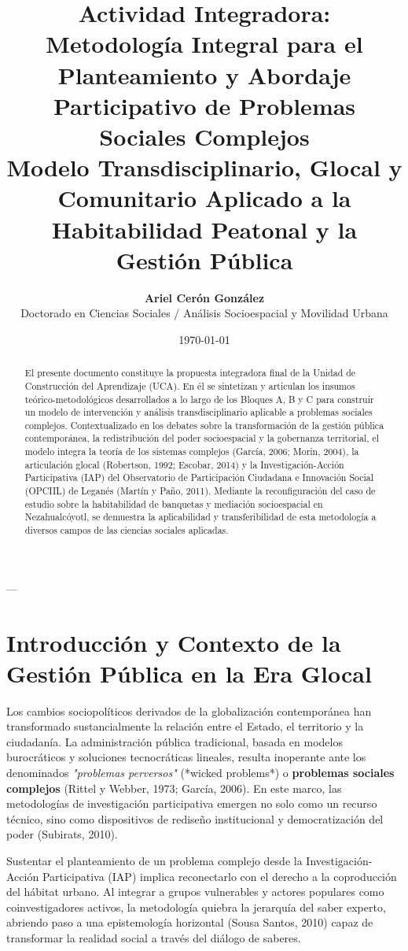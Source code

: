\documentclass[12pt,a4paper]{article}
\title{\textbf{Actividad Integradora: Metodología Integral para el Planteamiento y Abordaje Participativo de Problemas Sociales Complejos}\\
\large Modelo Transdisciplinario, Glocal y Comunitario Aplicado a la Habitabilidad Peatonal y la Gestión Pública}
\author{\textbf{Ariel Cerón González}\\ Doctorado en Ciencias Sociales / Análisis Socioespacial y Movilidad Urbana}
\date{\today}
\begin{document}
\maketitle

\begin{abstract}
El presente documento constituye la propuesta integradora final de la Unidad de Construcción del Aprendizaje (UCA). En él se sintetizan y articulan los insumos teórico-metodológicos desarrollados a lo largo de los Bloques A, B y C para construir un modelo de intervención y análisis transdisciplinario aplicable a problemas sociales complejos. Contextualizado en los debates sobre la transformación de la gestión pública contemporánea, la redistribución del poder socioespacial y la gobernanza territorial, el modelo integra la teoría de los sistemas complejos (García, 2006; Morin, 2004), la articulación glocal (Robertson, 1992; Escobar, 2014) y la Investigación-Acción Participativa (IAP) del Observatorio de Participación Ciudadana e Innovación Social (OPCIIL) de Leganés (Martín y Paño, 2011). Mediante la reconfiguración del caso de estudio sobre la habitabilidad de banquetas y mediación socioespacial en Nezahualcóyotl, se demuestra la aplicabilidad y transferibilidad de esta metodología a diversos campos de las ciencias sociales aplicadas.
\end{abstract}

---

\section{Introducción y Contexto de la Gestión Pública en la Era Glocal}

Los cambios sociopolíticos derivados de la globalización contemporánea han transformado sustancialmente la relación entre el Estado, el territorio y la ciudadanía. La administración pública tradicional, basada en modelos burocráticos y soluciones tecnocráticas lineales, resulta inoperante ante los denominados \textit{"problemas perversos"} (*wicked problems*) o \textbf{problemas sociales complejos} (Rittel y Webber, 1973; García, 2006). En este marco, las metodologías de investigación participativa emergen no solo como un recurso técnico, sino como dispositivos de rediseño institucional y democratización del poder (Subirats, 2010).

Sustentar el planteamiento de un problema complejo desde la Investigación-Acción Participativa (IAP) implica reconectarlo con el derecho a la coproducción del hábitat urbano. Al integrar a grupos vulnerables y actores populares como coinvestigadores activos, la metodología quiebra la jerarquía del saber experto, abriendo paso a una epistemología horizontal (Sousa Santos, 2010) capaz de transformar la realidad social a través del diálogo de saberes.
\end{document}
